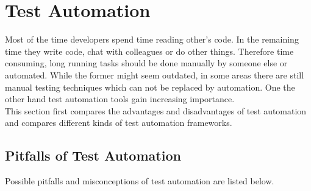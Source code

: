 \documentclass[12pt, notitlepage]{article}
\begin{document}
\section{Test Automation}
Most of the time developers spend time reading other's code. In the remaining time they write code, chat with colleagues or do other things.
Therefore time consuming, long running tasks should be done manually by someone else or automated.
While the former might seem outdated, in some areas there are still manual testing techniques which can not be replaced by automation.
One the other hand test automation tools gain increasing importance.\\
This section first compares the advantages and disadvantages of test automation and compares different kinds of test automation frameworks.
\subsection{Pitfalls of Test Automation}
Possible pitfalls and misconceptions\cite{test-automation-success} of test automation are listed below.
\end{document}
